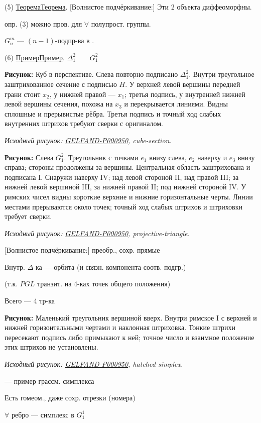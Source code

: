 \documentclass[11pt]{article}
\theoremstyle{definition}
\theoremstyle{remark}
\newcommand{\Unclear}[3]{%
  \begingroup\color{orange!70!black}%
  [Unresolved reading #1/#2: #3]\endgroup%
}
\newcommand{\SourceFigure}[3]{%
  \par\begingroup\color{blue!60!black}\textbf{\hyperref[#1:source-page]{Source figure #1/#2}:} #3%
  \par\textit{Consult the authoritative scan at this locator.}\endgroup\par%
}
\renewcommand{\Unclear}[3]{%
  \begingroup\color{orange!65!black}%
  \ifmmode\text{[неясно: #3]}\else[неясно: #3]\fi\endgroup%
}
\renewcommand{\SourceFigure}[3]{%
  \par\begingroup\color{blue!55!black}\textbf{Рисунок:} #3%
  \par{\small\textit{Исходный рисунок: \hyperref[#1:source-page]{#1}, #2.}}%
  \endgroup\par%
}
\let\DiplomaticMathUnderline\underline
\renewcommand{\underline}[1]{\ifmmode\DiplomaticMathUnderline{#1}\else\uline{#1}\fi}
\begin{document}
(5) \underline{Теорема}.
[Волнистое подчёркивание:] Эти 2 объекта диффеоморфны.

опр. (3) можно пров. для $\forall$ полупрост. группы.

$G_n^m$ — $(n-1)$-подпр-ва в
\Unclear{GELFAND-P000950}{projective-index}{$P_{n+m-1}$ / $P_{m+n-1}$}.

(6) \underline{Пример}.
$\Delta_1^2\qquad G_1^2$

\SourceFigure{GELFAND-P000950}{cube-section}{Куб в перспективе. Слева повторно подписано $\Delta_1^2$. Внутри треугольное заштрихованное сечение с подписью $H$. У верхней левой вершины передней грани стоит $x_2$, у нижней правой — $x_1$; третья подпись, у внутренней нижней левой вершины сечения, похожа на $x_3$ и перекрывается линиями. Видны сплошные и прерывистые рёбра. Третья подпись и точный ход слабых внутренних штрихов требуют сверки с оригиналом.}

\SourceFigure{GELFAND-P000950}{projective-triangle}{Слева $G_1^2$. Треугольник с точками $e_1$ внизу слева, $e_2$ наверху и $e_3$ внизу справа; стороны продолжены за вершины. Центральная область заштрихована и подписана I. Снаружи наверху IV; над левой стороной II, над правой III; за нижней левой вершиной III, за нижней правой II; под нижней стороной IV. У римских чисел видны короткие верхние и нижние горизонтальные черты. Линии местами прерываются около точек; точный ход слабых штрихов и штриховки требует сверки.}

[Волнистое подчёркивание:]
преобр., сохр. \Unclear{GELFAND-P000950}{preserved-symbol}{и / 3} прямые

Внутр. $\Delta$-ка — орбита (и связн. компонента соотв. подгр.)

(т.к. $PGL$ транзит. на 4-ках точек общего положения)

Всего — 4 тр-ка

\SourceFigure{GELFAND-P000950}{hatched-simplex}{Маленький треугольник вершиной вверх. Внутри римское I с верхней и нижней горизонтальными чертами и наклонная штриховка. Тонкие штрихи пересекают подпись либо примыкают к ней; точное число и взаимное положение этих штрихов не установлены.}
— пример грассм. симплекса

Есть гомеом., даже сохр. отрезки (номера)

$\forall$ ребро — симплекс в $G_1^1$
\end{document}
